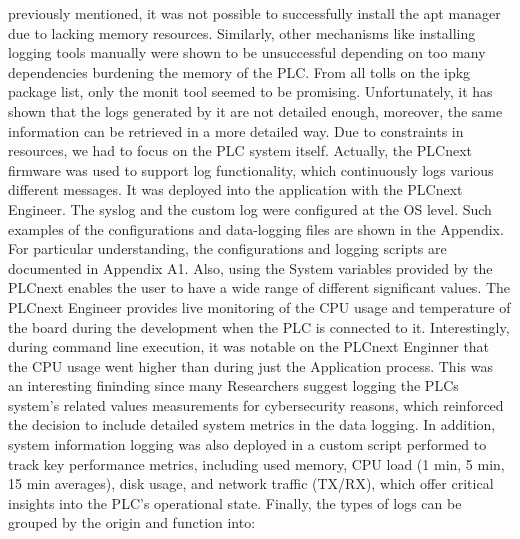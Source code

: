 \documentclass[Master,BMR,english]{twbook}
\begin{document}
previously mentioned, it was not possible to successfully install the apt manager due to lacking memory resources. Similarly, other mechanisms like installing logging tools manually were shown to be unsuccessful depending on too many dependencies burdening the memory of the PLC. From all tolls on the ipkg package list, only the monit tool seemed to be promising\cite{optware_ng_2024}\cite{mmonit_manual_2024}. Unfortunately, it has shown that the logs generated by it are not detailed enough, moreover, the same information can be retrieved in a more detailed way. Due to constraints in resources, we had to focus on the PLC system itself. Actually, the PLCnext firmware was used to support log functionality, which continuously logs various different messages. It was deployed into the application with the PLCnext Engineer. The syslog and the custom log were configured at the OS level. Such examples of the configurations and data-logging files are shown in the Appendix. For particular understanding, the configurations and logging scripts are documented in Appendix A1. Also, using the System variables provided by the PLCnext enables the user to have a wide range of different significant values\cite{phoenixcontact_plcnext_engineer}. The PLCnext Engineer provides live monitoring of the  CPU usage and temperature of the board during the development when the PLC is connected to it. Interestingly, during command line execution, it was notable on the PLCnext Enginner that the CPU usage went higher than during just the Application process. This was an interesting fininding since many Researchers suggest logging the PLCs system's related values measurements for cybersecurity reasons, which reinforced the decision to include detailed system metrics in the data logging. In addition, system information logging was also deployed in a custom script performed to track key performance metrics, including used memory, CPU load (1 min, 5 min, 15 min averages), disk usage, and network traffic (TX/RX), which offer critical insights into the PLC's operational state.  Finally, the types of logs can be grouped by the origin and function into:
\end{document}
